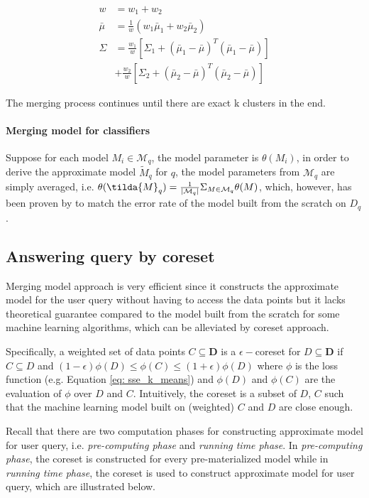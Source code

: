\begin{equation}\label{eq: GMM_merging}
    \begin{split}
        w &= w_1 + w_2\\
        \bar{\mu} &= \frac{1}{w}(w_1\bar{\mu}_1 + w_2\bar{\mu}_2)\\
        \Sigma &= \frac{w_1}{w}[\Sigma_1 + (\bar{\mu}_1 - \bar{\mu})^T(\bar{\mu}_1 -\bar{\mu})]\\
        &+\frac{w_2}{w}[\Sigma_2 + (\bar{\mu}_2 - \bar{\mu})^T(\bar{\mu}_2 -\bar{\mu})]
    \end{split}
\end{equation}

The merging process continues until there are exact k clusters in the end.


\paragraph{Merging model for classifiers}
Suppose for each model $M_i \in \mathcal{M}_q$, the model parameter is $\theta(M_i)$, in order to derive the approximate model $\tilde{M}_q$ for $q$, the model parameters from $\mathcal{M}_q$ are simply averaged, i.e. $\theta(\tilda{M}_q) = \frac{1}{|\mathcal{M}_q|}\Sigma_{M \in \mathcal{M}_q}\theta(M)$, which, however, has been proven by \cite{zhang2012communication} to match the error rate of the model built from the scratch on $D_q$.

\subsection{Answering query by coreset}
Merging model approach is very efficient since it constructs the approximate model for the user query without having to access the data points but it lacks theoretical guarantee compared to the model built from the scratch for some machine learning algorithms, which can be alleviated by coreset approach.

Specifically, a weighted set of data points $C \subseteq \textbf{D}$ is a $\epsilon-$coreset for $D \subseteq \textbf{D}$ if $C \subseteq D$ and $(1-\epsilon)\phi(D) \leq \phi(C) \leq (1+\epsilon)\phi(D)$ where $\phi$ is the loss function (e.g. Equation \ref{eq: sse_k_means}) and $\phi(D)$ and $\phi(C)$ are the evaluation of $\phi$ over $D$ and $C$. Intuitively, the coreset is a subset of $D$, $C$ such that the machine learning model built on (weighted) $C$ and $D$ are close enough.

Recall that there are two computation phases for constructing approximate model for user query, i.e. {\em pre-computing phase} and {\em running time phase}. In {\em pre-computing phase}, the coreset is constructed for every pre-materialized model while in {\em running time phase}, the coreset is used to construct approximate model for user query, which are illustrated below.

